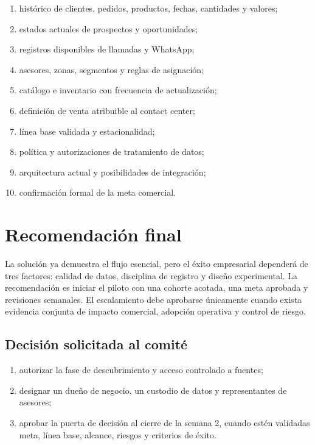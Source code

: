 \documentclass[11pt,a4paper]{article}
\begin{document}
\begin{enumerate}
  \item histórico de clientes, pedidos, productos, fechas, cantidades y valores;
  \item estados actuales de prospectos y oportunidades;
  \item registros disponibles de llamadas y WhatsApp;
  \item asesores, zonas, segmentos y reglas de asignación;
  \item catálogo e inventario con frecuencia de actualización;
  \item definición de venta atribuible al contact center;
  \item línea base validada y estacionalidad;
  \item política y autorizaciones de tratamiento de datos;
  \item arquitectura actual y posibilidades de integración;
  \item confirmación formal de la meta comercial.
\end{enumerate}

\section{Recomendación final}

La solución ya demuestra el flujo esencial, pero el éxito empresarial dependerá
de tres factores: calidad de datos, disciplina de registro y diseño experimental.
La recomendación es iniciar el piloto con una cohorte acotada, una meta aprobada
y revisiones semanales. El escalamiento debe aprobarse únicamente cuando exista
evidencia conjunta de impacto comercial, adopción operativa y control de riesgo.

\subsection{Decisión solicitada al comité}

\begin{enumerate}
  \item autorizar la fase de descubrimiento y acceso controlado a fuentes;
  \item designar un dueño de negocio, un custodio de datos y representantes de
  asesores;
  \item aprobar la puerta de decisión al cierre de la semana 2, cuando estén
  validadas meta, línea base, alcance, riesgos y criterios de éxito.
\end{enumerate}
\end{document}
